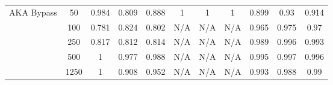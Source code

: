 \begin{table*}[]
{\begin{tabular}{ccccccccccc}
			\multicolumn{1}{|c|}{\multirow{6}{*}{AKA Bypass}}                 & \multicolumn{1}{c|}{50}            & \multicolumn{1}{c|}{0.984}                   & \multicolumn{1}{c|}{0.809}                & \multicolumn{1}{c|}{0.888}            & \multicolumn{1}{c|}{1}                      & \multicolumn{1}{c|}{1}                   & \multicolumn{1}{c|}{1}               & \multicolumn{1}{c|}{0.899}                  & \multicolumn{1}{c|}{0.93}                & \multicolumn{1}{c|}{0.914}           \\ \cline{2-11}
			\multicolumn{1}{|c|}{}                                            & \multicolumn{1}{c|}{100}           & \multicolumn{1}{c|}{0.781}                   & \multicolumn{1}{c|}{0.824}                & \multicolumn{1}{c|}{0.802}            & \multicolumn{1}{c|}{N/A}                      & \multicolumn{1}{c|}{N/A}                   & \multicolumn{1}{c|}{N/A}               & \multicolumn{1}{c|}{0.965}                  & \multicolumn{1}{c|}{0.975}               & \multicolumn{1}{c|}{0.97}            \\ \cline{2-11}
			\multicolumn{1}{|c|}{}                                            & \multicolumn{1}{c|}{250}           & \multicolumn{1}{c|}{0.817}                   & \multicolumn{1}{c|}{0.812}                & \multicolumn{1}{c|}{0.814}            & \multicolumn{1}{c|}{N/A}                      & \multicolumn{1}{c|}{N/A}                   & \multicolumn{1}{c|}{N/A}               & \multicolumn{1}{c|}{0.989}                  & \multicolumn{1}{c|}{0.996}               & \multicolumn{1}{c|}{0.993}           \\ \cline{2-11}
			\multicolumn{1}{|c|}{}                                            & \multicolumn{1}{c|}{500}           & \multicolumn{1}{c|}{1}                       & \multicolumn{1}{c|}{0.977}                & \multicolumn{1}{c|}{0.988}            & \multicolumn{1}{c|}{N/A}                      & \multicolumn{1}{c|}{N/A}                   & \multicolumn{1}{c|}{N/A}               & \multicolumn{1}{c|}{0.995}                  & \multicolumn{1}{c|}{0.997}               & \multicolumn{1}{c|}{0.996}           \\ \cline{2-11}
			\multicolumn{1}{|c|}{}                                            & \multicolumn{1}{c|}{1250}          & \multicolumn{1}{c|}{1}                       & \multicolumn{1}{c|}{0.908}                & \multicolumn{1}{c|}{0.952}            & \multicolumn{1}{c|}{N/A}                      & \multicolumn{1}{c|}{N/A}                   & \multicolumn{1}{c|}{N/A}               & \multicolumn{1}{c|}{0.993}                  & \multicolumn{1}{c|}{0.988}               & \multicolumn{1}{c|}{0.99}            \\ \cline{2-11}

\end{tabular}}
\end{table*}
